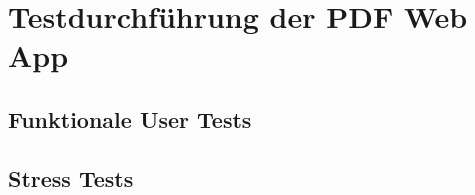 \section{Testdurchführung der PDF Web App}

\subsection{Funktionale User Tests}

\subsection{Stress Tests}